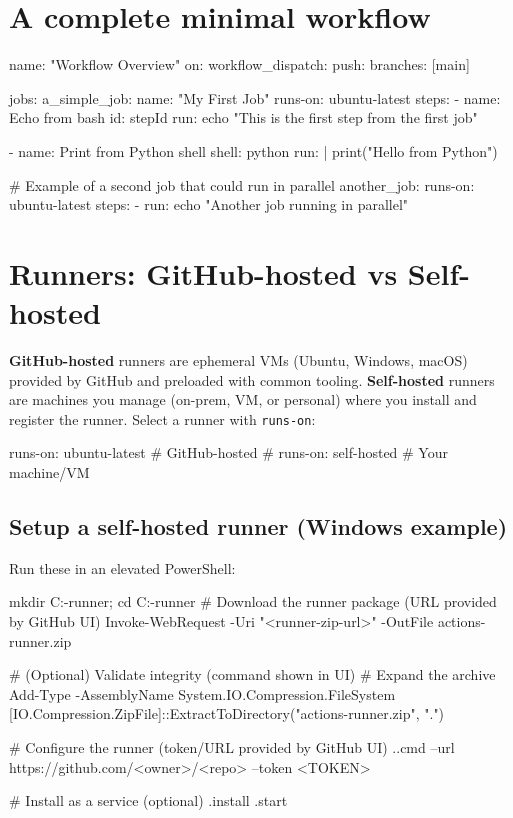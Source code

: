 \documentclass[11pt]{article}
\begin{document}
\section{A complete minimal workflow}
\begin{yamlcode}
name: "Workflow Overview"
on:
  workflow_dispatch:
  push: { branches: [main] }

jobs:
  a_simple_job:
    name: "My First Job"
    runs-on: ubuntu-latest
    steps:
      - name: Echo from bash
        id: stepId
        run: echo "This is the first step from the first job"

      - name: Print from Python shell
        shell: python
        run: |
          print("Hello from Python")

  # Example of a second job that could run in parallel
  another_job:
    runs-on: ubuntu-latest
    steps:
      - run: echo "Another job running in parallel"
\end{yamlcode}
\clearpage

\section{Runners: GitHub-hosted vs Self-hosted}
\textbf{GitHub-hosted} runners are ephemeral VMs (Ubuntu, Windows, macOS) provided by GitHub and preloaded with common tooling. \textbf{Self-hosted} runners are machines you manage (on-prem, VM, or personal) where you install and register the runner. Select a runner with \verb|runs-on|:
\begin{yamlcode}
runs-on: ubuntu-latest     # GitHub-hosted
# runs-on: self-hosted     # Your machine/VM
\end{yamlcode}

\subsection*{Setup a self-hosted runner (Windows example)}
Run these in an elevated PowerShell:
\begin{powershellcode}
mkdir C:\actions-runner; cd C:\actions-runner
# Download the runner package (URL provided by GitHub UI)
Invoke-WebRequest -Uri "<runner-zip-url>" -OutFile actions-runner.zip

# (Optional) Validate integrity (command shown in UI)
# Expand the archive
Add-Type -AssemblyName System.IO.Compression.FileSystem
[IO.Compression.ZipFile]::ExtractToDirectory("actions-runner.zip", ".")

# Configure the runner (token/URL provided by GitHub UI)
.\config.cmd --url https://github.com/<owner>/<repo> --token <TOKEN>

# Install as a service (optional)
.\svc install
.\svc start
\end{powershellcode}
\end{document}
